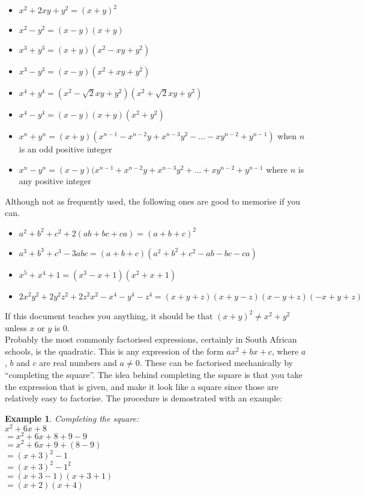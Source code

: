 \documentclass[a4paper,12pt]{article}
\newtheorem{example}{Example}[section]
\begin{document}
\begin{itemize}

\item $x^2 + 2xy + y^2 = (x + y) ^ 2$ 
\item $x^2 - y^2 = (x - y)(x + y)$
\item $x^3 + y^3 = (x + y)(x^2 - xy + y^2)$
\item $x^3 - y^3 = (x - y)(x^2 + xy + y^2)$
\item $x^4 + y^4 = (x^2 - \sqrt{2}xy + y^2)(x^2 + \sqrt{2}xy + y^2)$
\item $x^4 - y^4 = (x - y)(x + y)(x^2 + y^2)$
\item $x^n + y^n = (x + y)(x^{n - 1} - x^{n - 2}y + x^{n - 3}y^2 - ... - xy^{n - 2} + y^{n - 1})$ when $n$ is an odd positive integer
\item $x^n - y^n = (x - y)(x^{n - 1} + x^{n - 2}y + x^{n - 3}y^2 + ... + xy^{n - 2} + y^{n - 1}$ where $n$ is any positive integer

\end{itemize}

Although not as frequently used, the following ones are good to memorise if you can.

\begin{itemize}

\item $a^2 + b^2 + c^2 + 2(ab + bc + ca) = (a + b + c)^2$
\item $a^3 + b^3 + c^3 - 3abc = (a + b + c)(a^2 + b^2 + c^2 - ab - bc - ca)$
\item $x^5 + x^4 + 1 = (x^3 - x + 1)(x^2 + x + 1)$
\item $2x^2y^2 + 2y^2z^2 + 2z^2x^2 - x^4 - y^4 - z^4 = (x + y + z)(x + y - z)(x - y + z)(-x + y + z)$

\end{itemize}

If this document teaches you anything, it should be that $(x + y)^2 \neq x^2 + y^2$ unless $x$ or $y$ is 0.\\

Probably the most commonly factorised expressions, certainly in South African schools, is the quadratic. This is any expression of the form $ax^2 + bx + c$, where $a$, $b$ and $c$ are real numbers and $a \neq 0$. These can be factorised mechanically by ``completing the square''.  The idea behind completing the square is that you take the expression that is given, and make it look like a square since those are relatively easy to factorise. The procedure is demostrated with an example: \\
\begin{example}
Completing the square:\\
    $x^2 + 6x + 8$ \\ 
    $= x^2 + 6x + 8 + 9 - 9$ \\ 
    $= x^2 + 6x + 9 + (8 - 9)$ \\
    $= (x + 3)^2 - 1$ \\
    $= (x + 3)^2 - 1^2$ \\
    $= (x + 3 - 1)(x + 3 + 1)$ \\ 
    $= (x + 2)(x + 4)$ \\
\end{example}
\end{document}
